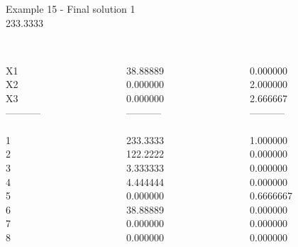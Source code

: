 \begin{frame}{Example 15 - Final solution}
\footnotesize
{} 1 \\
  233.3333\\

\begin{columns}[t]
\begin{column}{0.3\textwidth}
\\
X1\\
X2\\
X3\\
-----------\\
\\
1\\
2\\
3\\
4\\
5\\
6\\
7\\
8\\

\end{column}
\begin{column}{0.3\textwidth}
\\
38.88889\\
0.000000\\
0.000000\\

-----------\\
\\
233.3333\\
122.2222\\
3.333333\\
4.444444\\
0.000000\\
38.88889\\
0.000000\\
0.000000\\

\end{column}

\begin{column}{0.3\textwidth}
\\
0.000000\\
2.000000\\
2.666667\\

-----------\\
\\
1.000000\\
0.000000\\
0.000000\\
0.000000\\
0.6666667\\
0.000000\\
0.000000\\
0.000000\\
\end{column}
\end{columns}
\end{frame}
